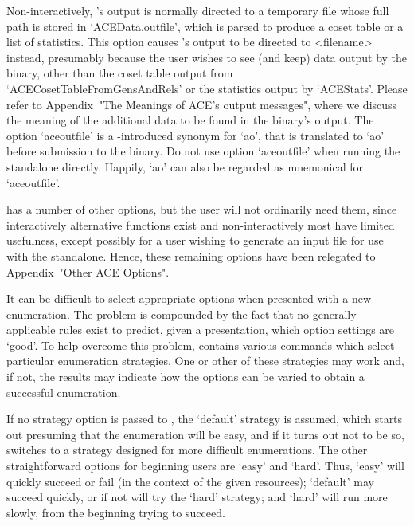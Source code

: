 Non-interactively, {\ACE}'s output is normally directed to a temporary
file whose full path is stored in `ACEData.outfile', which  is  parsed
to produce a coset table or a list of statistics. This  option  causes
{\ACE}'s output to  be  directed  to  <filename>  instead,  presumably
because the user wishes to see (and keep) data output  by  the  {\ACE}
binary,    other    than    the    coset     table     output     from
`ACECosetTableFromGensAndRels' or the statistics output by `ACEStats'.
Please refer to Appendix~"The  Meanings  of  ACE's  output  messages",
where we discuss the meaning of the additional data to be found in the
{\ACE} binary's output. The option `aceoutfile' is a {\GAP}-introduced
synonym for `ao', that is translated to `ao' before submission to  the
{\ACE} binary.  Do  not  use  option  `aceoutfile'  when  running  the
standalone directly. Happily, `ao' can also be regarded as  mnemonical
for `aceoutfile'.

\enditems


{\ACE} has a number of other options, but the  {\GAP}  user  will  not
ordinarily need them, since interactively alternative functions  exist
and non-interactively most have limited  usefulness,  except  possibly
for a user wishing to generate an input file for use with  the  {\ACE}
standalone. Hence, these remaining  options  have  been  relegated  to
Appendix~"Other ACE Options".


It can be difficult to select appropriate options when presented  with
a new enumeration. The problem is  compounded  by  the  fact  that  no
generally applicable rules exist to  predict,  given  a  presentation,
which option settings are \lq{}good'. To help overcome  this  problem,
{\ACE} contains various commands which select  particular  enumeration
strategies. One or other of these strategies may work and, if not, the
results may indicate how  the  options  can  be  varied  to  obtain  a
successful enumeration. 

If no strategy option is passed to {\ACE}, the `default'  strategy  is
assumed, which starts out presuming that the enumeration will be easy,
and if it turns out not to  be  so,  {\ACE}  switches  to  a  strategy
designed for more difficult enumerations.  The  other  straightforward
options for beginning users are `easy' and `hard'. Thus,  `easy'  will
quickly succeed or fail (in  the  context  of  the  given  resources);
`default' may succeed quickly, or if not will try the `hard' strategy;
and `hard' will run more slowly, from the beginning trying to succeed.

